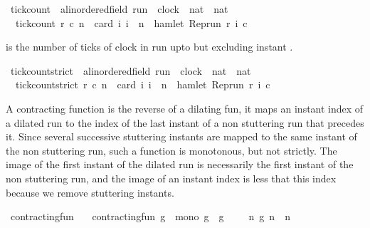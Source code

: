 \begin{isabellebody}
\isamarkupfalse%
\ tick{\isacharunderscore}count\ {\isacharcolon}{\isacharcolon}\ {\isacartoucheopen}{\isacharprime}a{\isacharcolon}{\isacharcolon}linordered{\isacharunderscore}field\ run\ {\isasymRightarrow}\ clock\ {\isasymRightarrow}\ nat\ {\isasymRightarrow}\ nat{\isacartoucheclose}\isanewline
{}\isanewline
\ \ {\isacartoucheopen}tick{\isacharunderscore}count\ r\ c\ n\ {\isacharequal}\ card\ {\isacharbraceleft}i{\isachardot}\ i\ {\isasymle}\ n\ {\isasymand}\ hamlet\ {\isacharparenleft}{\isacharparenleft}Rep{\isacharunderscore}run\ r{\isacharparenright}\ i\ c{\isacharparenright}{\isacharbraceright}{\isacartoucheclose}%
\begin{isamarkuptext}%
 is the number of ticks of clock  
  in run  upto but excluding instant .%
\end{isamarkuptext}\isamarkuptrue%
\isamarkupfalse%
\ tick{\isacharunderscore}count{\isacharunderscore}strict\ {\isacharcolon}{\isacharcolon}\ {\isacartoucheopen}{\isacharprime}a{\isacharcolon}{\isacharcolon}linordered{\isacharunderscore}field\ run\ {\isasymRightarrow}\ clock\ {\isasymRightarrow}\ nat\ {\isasymRightarrow}\ nat{\isacartoucheclose}\isanewline
{}\isanewline
\ \ {\isacartoucheopen}tick{\isacharunderscore}count{\isacharunderscore}strict\ r\ c\ n\ {\isacharequal}\ card\ {\isacharbraceleft}i{\isachardot}\ i\ {\isacharless}\ n\ {\isasymand}\ hamlet\ {\isacharparenleft}{\isacharparenleft}Rep{\isacharunderscore}run\ r{\isacharparenright}\ i\ c{\isacharparenright}{\isacharbraceright}{\isacartoucheclose}%
\begin{isamarkuptext}%
A contracting function is the reverse of a dilating fun, it maps an instant index 
  of a dilated run to the index of the last instant of a non stuttering run that
  precedes it. Since several successive stuttering instants are mapped to the same
  instant of the non stuttering run, such a function is monotonous, but not strictly.
  The image of the first instant of the dilated run is necessarily the first instant
  of the non stuttering run, and the image of an instant index is less that this 
  index because we remove stuttering instants.%
\end{isamarkuptext}\isamarkuptrue%
\isamarkupfalse%
\ contracting{\isacharunderscore}fun\isanewline
\ \ \ {\isacartoucheopen}contracting{\isacharunderscore}fun\ g\ {\isasymequiv}\ mono\ g\ {\isasymand}\ g\ {}\ {\isacharequal}\ {}\ {\isasymand}\ {\isacharparenleft}{\isasymforall}n{\isachardot}\ g\ n\ {\isasymle}\ n{\isacharparenright}{\isacartoucheclose}\isanewline

\end{isabellebody}
